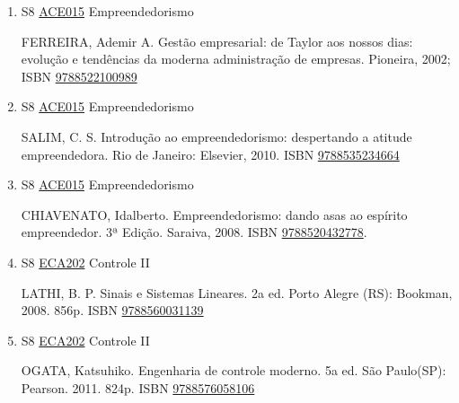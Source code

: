 \documentclass[12pt,a4paper]{book}
\begin{document}
\begin{enumerate}
 RAMALHO, G.  L. B..  Redes de Petri para CLP.  IFCE.  2014.  50p.  ISBN \href{http://www.bn.br/site/pages/servicosProfissionais/agenciaISBN/isbnBusca/FbnBuscaISBNCatalogo.asp?pField=ISBN&pIntPagina=1&pISBN=63953391&nidbISBN=true&hidbISBN=true}{9788563953391}. 
 
 
 \item S8 \hyperref[PUD:ACE015]{ACE015} Empreendedorismo

  FERREIRA, Ademir A.  Gestão empresarial: de Taylor aos nossos dias: evolução e tendências da moderna administração de empresas.  Pioneira, 2002;  ISBN \href{http://www.bn.br/site/pages/servicosProfissionais/agenciaISBN/isbnBusca/FbnBuscaISBNCatalogo.asp?pField=ISBN&pIntPagina=1&pISBN=22100989&nidbISBN=true&hidbISBN=true}{9788522100989}
 
 
 \item S8 \hyperref[PUD:ACE015]{ACE015} Empreendedorismo

  SALIM, C.  S.  Introdução ao empreendedorismo: despertando a atitude empreendedora.  Rio de Janeiro: Elsevier, 2010.  ISBN \href{http://www.bn.br/site/pages/servicosProfissionais/agenciaISBN/isbnBusca/FbnBuscaISBNCatalogo.asp?pField=ISBN&pIntPagina=1&pISBN=35234664&nidbISBN=true&hidbISBN=true}{9788535234664}
 
 
 \item S8 \hyperref[PUD:ACE015]{ACE015} Empreendedorismo

  CHIAVENATO, Idalberto.  Empreendedorismo: dando asas ao espírito empreendedor.  3ª Edição.  Saraiva, 2008.  ISBN \href{http://www.bn.br/site/pages/servicosProfissionais/agenciaISBN/isbnBusca/FbnBuscaISBNCatalogo.asp?pField=ISBN&pIntPagina=1&pISBN=20432778&nidbISBN=true&hidbISBN=true}{9788520432778}.
 \item S8 \hyperref[PUD:ECA202]{ECA202} Controle II

 LATHI, B.  P.  Sinais e Sistemas Lineares.  2a ed.  Porto Alegre (RS): Bookman, 2008.  856p.  ISBN \href{http://www.bn.br/site/pages/servicosProfissionais/agenciaISBN/isbnBusca/FbnBuscaISBNCatalogo.asp?pField=ISBN&pIntPagina=1&pISBN=60031139&nidbISBN=true&hidbISBN=true}{9788560031139}

 
 
 \item S8 \hyperref[PUD:ECA202]{ECA202} Controle II

 OGATA, Katsuhiko.  Engenharia de controle moderno.  5a ed.  São Paulo(SP): Pearson.  2011.  824p.  ISBN \href{http://www.bn.br/site/pages/servicosProfissionais/agenciaISBN/isbnBusca/FbnBuscaISBNCatalogo.asp?pField=ISBN&pIntPagina=1&pISBN=76058106&nidbISBN=true&hidbISBN=true}{9788576058106} 


\end{enumerate}
\end{document}
